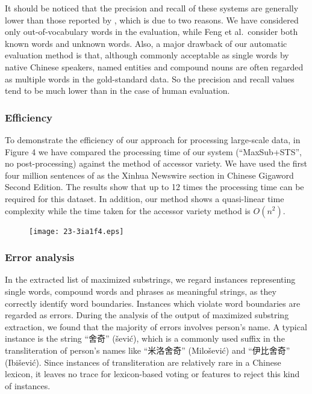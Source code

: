 \documentclass[english]{jnlp_1.4}
\begin{document}
It should be noticed that the precision and recall of these systems are generally lower than those reported by \cite{feng2004accessor}, which is due to two reasons. We have considered only out-of-vocabulary words in the evaluation, while Feng et al.\ consider both known words and unknown words. Also, a major drawback of our automatic evaluation method is that, although commonly acceptable as single words by native Chinese speakers, named entities and compound nouns are often regarded as multiple words in the gold-standard data. So the precision and recall values tend to be much lower than in the case of human evaluation. 


\subsubsection{Efficiency}

To demonstrate the efficiency of our approach for processing large-scale data, in Figure 4 we have compared the processing time of our system (``MaxSub+STS'', no post-processing) against the method of accessor variety. We have used the first four million sentences of as the Xinhua Newswire section in Chinese Gigaword Second Edition. The results show that up to 12 times the processing time can be required for this dataset. In addition, our method shows a quasi-linear time complexity while the time taken for the accessor variety method is $O(n^2)$.

\begin{figure}[t]
\begin{center}
\texttt{[image: 23-3ia1f4.eps]}
\end{center}
\end{figure}


\subsubsection{Error analysis}

In the extracted list of maximized substrings, we regard instances representing single words, compound words and phrases as meaningful strings, as they correctly identify word boundaries. Instances which violate word boundaries are regarded as errors. During the analysis of the output of maximized substring extraction, we found that the majority of errors involves person's name. A typical instance is the string ``舍奇'' (\v{s}evi\'{c}), which is a commonly used suffix in the transliteration of person's names like ``米洛舍奇'' (Milo\v{s}evi\'{c}) and ``伊比舍奇'' (Ibi\v{s}evi\'{c}). Since instances of transliteration are relatively rare in a Chinese lexicon, it leaves no trace for lexicon-based voting or features to reject this kind of instances. 
\end{document}
